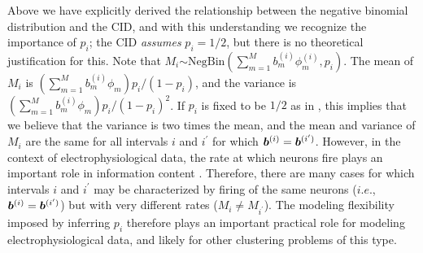 \documentclass[journal]{IEEEtran}
\begin{document}
Above we have explicitly derived the relationship between the negative binomial distribution and the CID, and with this understanding we recognize the importance of $p_i$; the CID \emph{assumes} $p_i=1/2$, but there is no theoretical justification for this. Note that  $M_i$$\sim\mbox{NegBin}(\sum_{m=1}^M b_m^{(i)}{\phi}_m^{(i)},p_i)$. The mean of $M_i$ is $(\sum_{m=1}^M b_m^{(i)}{\phi}_m) p_i/(1-p_i)$, and the variance is $(\sum_{m=1}^M b_m^{(i)}{\phi}_m)p_i/(1-p_i)^2$. If $p_i$ is fixed to be  {$1/2$} as in \cite{compound}, this implies that we believe that the variance is two times the mean, and the mean and variance of $M_i$ are the same for all intervals $i$ and $i^\prime$ for which $\boldsymbol{b}^{(i)}=\boldsymbol{b}^{(i^\prime)}$. However, in the context of electrophysiological data, the rate at which neurons fire plays an important role in information content \cite{Donoghue07}. Therefore, there are many cases for which intervals $i$ and $i^\prime$ may be characterized by firing of the same neurons ($i.e.$, $\boldsymbol{b}^{(i)}=\boldsymbol{b}^{(i^\prime)}$) but with very different rates ($M_i\neq M_{i^\prime}$). The modeling flexibility imposed by inferring $p_i$ therefore plays an important practical role for modeling electrophysiological data, and likely for other clustering problems of this type.
\end{document}
